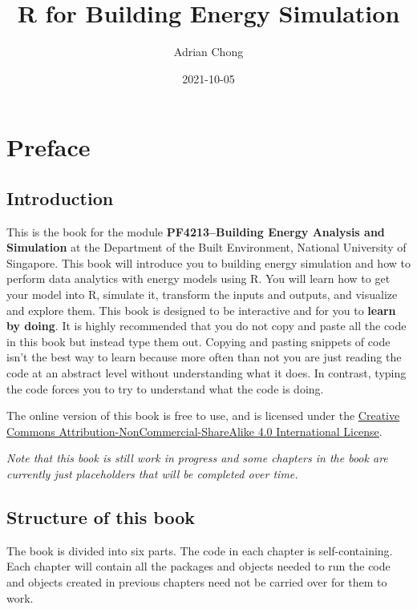 \documentclass[
]{book}
\title{R for Building Energy Simulation}
\author{Adrian Chong}
\date{2021-10-05}
\begin{document}
\maketitle

{
\setcounter{tocdepth}{1}
\tableofcontents
}
\hypertarget{preface}{%
\chapter*{Preface}\label{preface}}

\hypertarget{introduction}{%
\section*{Introduction}\label{introduction}}

This is the book for the module \textbf{PF4213--Building Energy Analysis and Simulation} at the Department of the Built Environment, National University of Singapore. This book will introduce you to building energy simulation and how to perform data analytics with energy models using R. You will learn how to get your model into R, simulate it, transform the inputs and outputs, and visualize and explore them. This book is designed to be interactive and for you to \textbf{learn by doing}. It is highly recommended that you do not copy and paste all the code in this book but instead type them out. Copying and pasting snippets of code isn't the best way to learn because more often than not you are just reading the code at an abstract level without understanding what it does. In contrast, typing the code forces you to try to understand what the code is doing.

The online version of this book is free to use, and is licensed under the \href{https://creativecommons.org/licenses/by-nc-sa/4.0/}{Creative Commons Attribution-NonCommercial-ShareAlike 4.0 International License}.

\emph{Note that this book is still work in progress and some chapters in the book are currently just placeholders that will be completed over time.}

\hypertarget{structure-of-this-book}{%
\section*{Structure of this book}\label{structure-of-this-book}}

The book is divided into six parts. The code in each chapter is self-containing. Each chapter will contain all the packages and objects needed to run the code and objects created in previous chapters need not be carried over for them to work.
\end{document}
